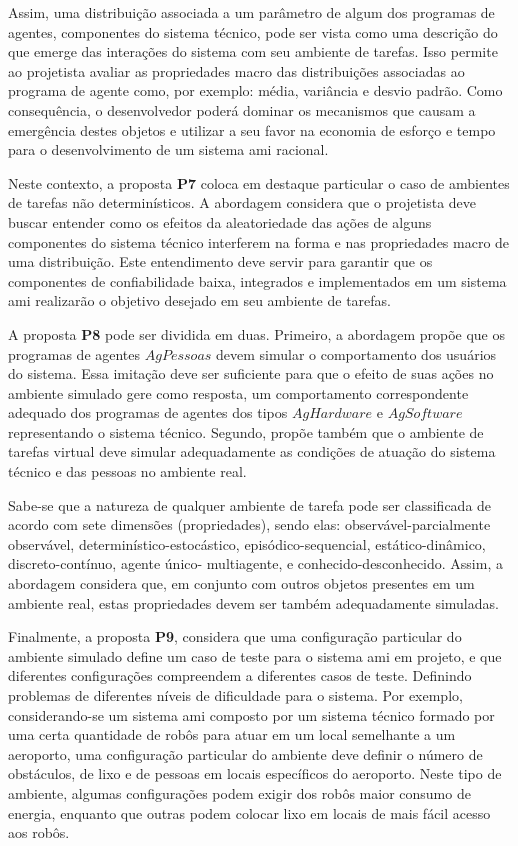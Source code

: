     Assim, uma distribuição associada a um parâmetro de algum dos programas de agentes, componentes do sistema técnico, pode ser vista como uma descrição do que emerge das interações do sistema com seu ambiente de tarefas. Isso permite ao projetista avaliar as propriedades macro das distribuições associadas ao programa de agente como, por exemplo: média, variância e desvio padrão. Como consequência, o desenvolvedor poderá dominar os mecanismos que causam a emergência destes objetos e utilizar a seu favor na economia de esforço e tempo para o desenvolvimento de um sistema \acrshort{ami} racional. 
    
    Neste contexto, a proposta \textbf{P7} coloca em destaque particular o caso de ambientes de tarefas não determinísticos. A abordagem considera que o projetista deve buscar entender como os efeitos da aleatoriedade das ações de alguns componentes do sistema técnico interferem na forma e nas propriedades macro de uma distribuição. Este entendimento deve servir para garantir que os componentes de confiabilidade baixa, integrados e implementados em um sistema \acrshort{ami} realizarão o objetivo desejado em seu ambiente de tarefas.
    
    A proposta \textbf{P8} pode ser dividida em duas. Primeiro, a abordagem propõe que os programas de agentes $AgPessoas$ devem simular o comportamento dos usuários do sistema. Essa imitação deve ser suficiente para que o efeito de suas ações no ambiente simulado gere como resposta, um comportamento correspondente adequado dos programas de agentes dos tipos $AgHardware$ e $AgSoftware$ representando o sistema técnico. Segundo, propõe também que o ambiente de tarefas virtual deve simular adequadamente as condições de atuação do sistema técnico e das pessoas no ambiente real. 
    
    Sabe-se que a natureza de qualquer ambiente de tarefa pode ser classificada de acordo com sete dimensões (propriedades), sendo elas: observável-parcialmente observável, determinístico-estocástico, episódico-sequencial, estático-dinâmico, discreto-contínuo, agente único- multiagente, e conhecido-desconhecido. Assim, a abordagem considera que, em conjunto com outros objetos presentes em um ambiente real, estas propriedades devem ser também adequadamente simuladas. 
    
    Finalmente, a proposta \textbf{P9}, considera que uma configuração particular do ambiente simulado define um caso de teste para o sistema \acrshort{ami} em projeto, e que diferentes configurações compreendem a diferentes casos de teste. Definindo problemas de diferentes níveis de dificuldade para o sistema. Por exemplo, considerando-se um sistema \acrshort{ami} composto por um sistema técnico formado por uma certa quantidade de robôs para atuar em um local semelhante a um aeroporto, uma configuração particular do ambiente deve definir o número de obstáculos, de lixo e de pessoas em locais específicos do aeroporto. Neste tipo de ambiente, algumas configurações podem exigir dos robôs maior consumo de energia, enquanto que outras podem colocar lixo em locais de mais fácil acesso aos robôs.
    

